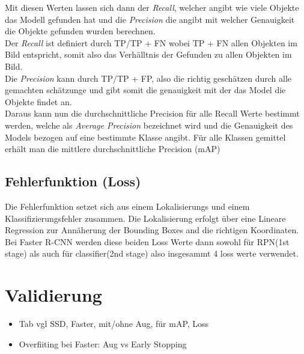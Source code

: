 Mit diesen Werten lassen sich dann der \textit{Recall}, welcher angibt wie 
viele Objekte das Modell gefunden hat und die \textit{Precision}
die angibt mit welcher Genauigkeit die Objekte gefunden wurden
berechnen.
\\
Der \textit{Recall} ist definiert durch TP/TP + FN
wobei TP + FN allen Objekten im Bild entspricht, somit also das 
Verhälltnis der Gefunden zu allen Objekten im Bild.
\\
Die \textit{Precision} kann durch TP/TP + FP, also die richtig 
geschätzen durch alle gemachten schätzunge und gibt somit die 
genauigkeit mit der das Model die Objekte findet an.
\\
Daraus kann nun die durchschnittliche Precision für alle Recall 
Werte bestimmt werden, welche als \textit{Average Precision}
bezeichnet wird und die Genauigkeit des Models bezogen auf 
eine bestimmte Klasse angibt. Für alle Klassen gemittel 
erhält man die mittlere durchschnittliche Precision (mAP)


\subsection*{Fehlerfunktion (Loss)}
Die Fehlerfunktion setzet sich aus einem Lokalisierungs und einem 
Klassifizierungsfehler zusammen. 
Die Lokalisierung erfolgt über eine Lineare Regression zur 
Annäherung der Bounding Boxes and die richtigen Koordinaten.\\

Bei Faster R-CNN werden diese beiden Loss Werte dann sowohl für 
RPN(1st stage) als auch für classifier(2nd stage) also 
insgesammt 4 loss werte verwendet.

\section{Validierung}
\begin{itemize}
  \item Tab vgl SSD, Faster, mit/ohne Aug, für mAP, Loss
  \item Overfiiting bei Faster: Aug vs Early Stopping
\end{itemize}



